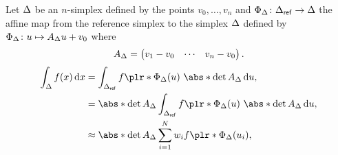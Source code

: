 \documentclass[english,12pt]{article}
\numberwithin{equation}{section}
\DeclarePairedDelimiter{\plr}\lparen\rparen%
\DeclarePairedDelimiter{\abs}\lvert\rvert%
\theoremstyle{definition}
\theoremstyle{plain}
\theoremstyle{remark}
\begin{document}
Let \( \Delta \) be an \( n \)-simplex defined by the points \( v_0, \ldots, v_n \) and \( \Phi_\Delta \colon \Delta_{\mathsf{ref}} \to \Delta \) the affine map from the reference simplex to the simplex \( \Delta \) defined by \( \Phi_\Delta \colon u \mapsto A_\Delta u + v_0 \) where
\[
    A_\Delta = \begin{pmatrix}
        v_1 - v_0 & \cdots & v_n - v_0
    \end{pmatrix}.
\]
\begin{align*}
    \int_\Simplex f(x) \di{x}
     & = \int_{\Simplex_\Rf} f\plr*{\Phi_\Simplex(u)} \ \abs*{\det A_\Simplex} \di{u},
    \\
     & = \abs*{\det A_\Simplex} \int_{\Simplex_\Rf} f\plr*{\Phi_\Simplex(u)} \ \abs*{\det A_\Simplex} \di{u},
    \\
     & \approx \abs*{\det A_\Simplex} \sum_{i=1}^N w_i f\plr*{\Phi_\Simplex(u_i)},
\end{align*}









\end{document}
